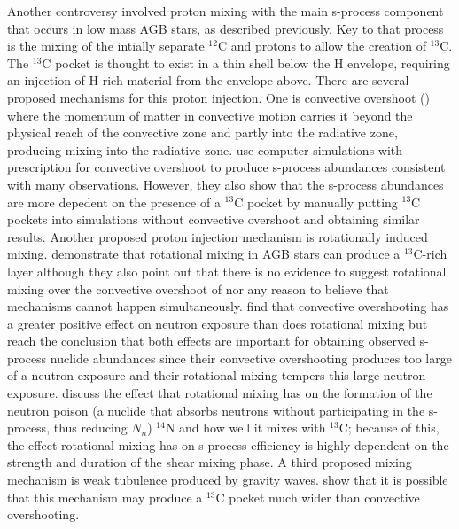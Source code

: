 
Another controversy involved proton mixing with the main s-process
component that occurs in low mass AGB stars, as described previously.
Key to that process is the mixing of the intially separate $^{12}$C
and protons to allow the creation of $^{13}$C.  The $^{13}$C pocket is
thought to exist in a thin shell below the H envelope, requiring an
injection of H-rich material from the envelope above. There are
several proposed mechanisms for this proton injection.  One is
convective overshoot (\citealt{herwigetal1997}) where the momentum of
matter in convective motion carries it beyond the physical reach of
the convective zone and partly into the radiative zone, producing
mixing into the radiative zone. \cite{lugaroetal2003} use computer
simulations with prescription for convective overshoot to produce
s-process abundances consistent with many observations. However, they 
also show that the s-process abundances are more depedent on the
presence of a $^{13}$C pocket by manually putting $^{13}$C pockets
into simulations without convective overshoot and obtaining similar
results. Another proposed proton injection mechanism is rotationally
induced mixing.  \cite{langeretal1999} demonstrate that rotational
mixing in AGB stars can produce a $^{13}$C-rich layer although they
also point out that there is no evidence to suggest rotational mixing
over the convective overshoot of \cite{herwigetal1997} nor any reason
to believe that mechanisms cannot happen
simultaneously.  \cite{herwig2003} find that convective overshooting
has a greater positive effect on neutron exposure than does rotational
mixing but reach the conclusion that both effects are important for
obtaining observed s-process nuclide abundances since their convective
overshooting produces too large of a neutron exposure and their
rotational mixing tempers this large neutron
exposure.  \cite{siess2004} discuss the effect that rotational mixing
has on the formation of the neutron poison (a nuclide that absorbs
neutrons without participating in the s-process, thus reducing $N_n$)
$^{14}$N and how well it mixes with $^{13}$C; because of this, the
effect rotational mixing has on s-process efficiency is highly
dependent on the strength and duration of the shear mixing phase.  A
third proposed mixing mechanism is weak tubulence produced by gravity
waves.  \cite{denissenkov2003} show that it is possible that this mechanism may
produce a $^{13}$C pocket much wider than convective overshooting.

